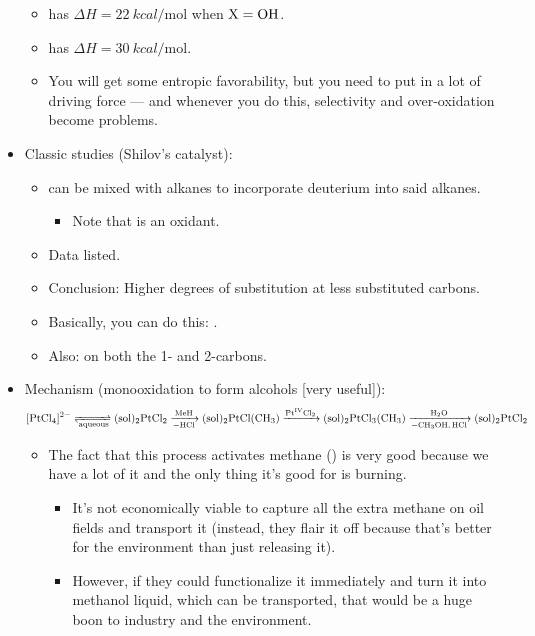\documentclass[../notes.tex]{subfiles}
\begin{document}
\begin{itemize}
\begin{itemize}
        \item {} has $\Delta H= \SI{22}{kcal\per\mole}$ when $\ce{X}=\ce{OH}$.
        \item {} has $\Delta H=\SI{30}{kcal\per\mole}$.
        \item You will get some entropic favorability, but you need to put in a lot of driving force --- and whenever you do this, selectivity and over-oxidation become problems.
    \end{itemize}
    \item Classic studies (Shilov's catalyst):
    \begin{itemize}
        \item {} can be mixed with alkanes to incorporate deuterium into said alkanes.
        \begin{itemize}
            \item Note that  is an oxidant.
        \end{itemize}
        \item Data listed.
        \item Conclusion: Higher degrees of substitution at less substituted carbons.
        \item Basically, you can do this: .
        \item Also:  on both the 1- and 2-carbons.
    \end{itemize}
    \item Mechanism (monooxidation to form alcohols [very useful]):
    \begin{equation*}
        \ce{[PtCl4]^2- <=>[][{aqueous}] ({sol})2PtCl2 ->[MeH][-HCl] ({sol})2PtCl(CH3) ->[Pt^{IV}Cl2] ({sol})2PtCl3(CH3) ->[H2O][-CH3OH, HCl] ({sol})2PtCl2}
    \end{equation*}
    \begin{itemize}
        \item The fact that this process activates methane () is very good because we have a lot of it and the only thing it's good for is burning.
        \begin{itemize}
            \item It's not economically viable to capture all the extra methane on oil fields and transport it (instead, they flair it off because that's better for the environment than just releasing it).
            \item However, if they could functionalize it immediately and turn it into methanol liquid, which can be transported, that would be a huge boon to industry and the environment.

\end{itemize}
\end{itemize}
\end{itemize}
\end{document}
